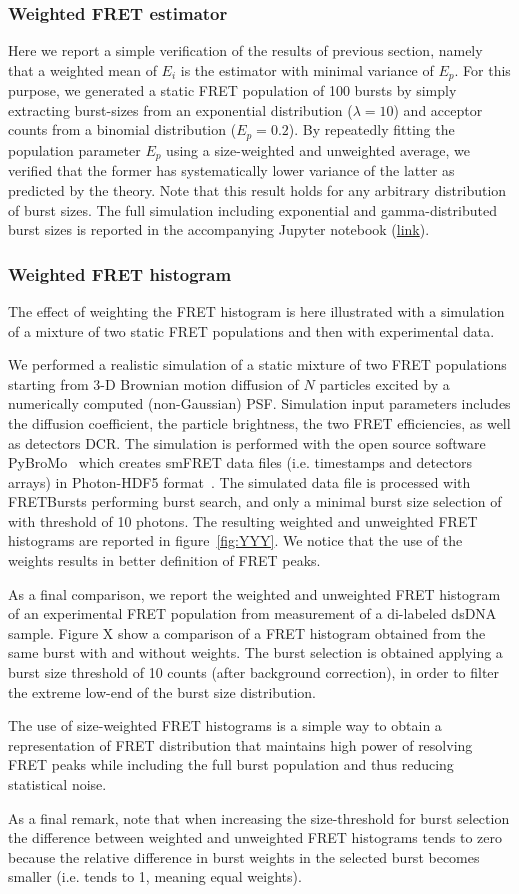 \subsubsection{Weighted FRET estimator}
Here we report a simple verification of the results of previous section, namely
that a weighted mean of $E_i$ is the estimator with minimal variance of $E_p$.
For this purpose, we generated a static FRET population of 100 bursts 
by simply extracting burst-sizes from an exponential distribution ($\lambda = 10$)
and acceptor counts from a binomial distribution ($E_p = 0.2$). 
By repeatedly fitting the population parameter $E_p$ using a 
size-weighted and unweighted average, we verified that the former has systematically
lower variance of the latter as predicted by the theory. Note that this result
holds for any arbitrary distribution of burst sizes. The full simulation 
including exponential and gamma-distributed burst sizes is reported in
the accompanying Jupyter notebook (\href{}{link}).

\subsubsection{Weighted FRET histogram}
The effect of weighting the FRET histogram is here illustrated with a simulation of
a mixture of two static FRET populations and then with experimental data.

We performed a realistic simulation of a static mixture of two FRET populations
starting from 3-D Brownian motion diffusion of $N$ particles excited by a 
numerically computed (non-Gaussian) PSF. Simulation input parameters includes
the diffusion coefficient, the particle brightness, the two FRET efficiencies,
as well as detectors DCR. The simulation is performed with the open source software 
PyBroMo~\cite{Ingargiola_2016} which creates smFRET data files (i.e. timestamps 
and detectors arrays) in Photon-HDF5 format~\cite{Ingargiola2016}.
The simulated data file is processed with FRETBursts performing burst search, 
and only a minimal burst size selection of with threshold of 10 photons.
The resulting weighted and unweighted FRET histograms are reported in figure~\ref{fig:YYY}.
We notice that the use of the weights results in better definition of FRET peaks.

As a final comparison, we report the weighted and unweighted FRET histogram of 
an experimental FRET population from measurement of a di-labeled dsDNA sample.
Figure X show a comparison of a FRET histogram obtained from the same burst
with and without weights. The burst selection is obtained applying a burst size
threshold of 10 counts (after background correction), in order to filter 
the extreme low-end of the burst size distribution.

The use of size-weighted FRET histograms is a simple way to obtain a representation of FRET 
distribution that maintains high power of resolving FRET peaks while including the full burst
population and thus reducing statistical noise.

As a final remark, note that when increasing the size-threshold for burst selection
the difference between weighted and unweighted FRET histograms tends to zero because
the relative difference in burst weights in the selected burst becomes smaller 
(i.e. tends to 1, meaning equal weights).